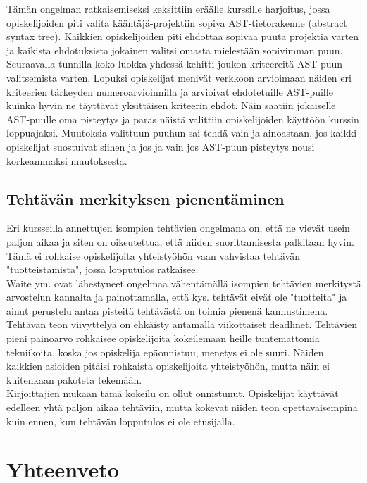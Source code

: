 \documentclass[finnish]{article}
\begin{document}
Tämän ongelman ratkaisemiseksi keksittiin eräälle kurssille harjoitus, jossa opiskelijoiden piti valita kääntäjä-projektiin sopiva AST-tietorakenne (abstract syntax tree). Kaikkien opiskelijoiden piti ehdottaa sopivaa puuta projektia varten ja kaikista ehdotuksista jokainen valitsi omasta mielestään sopivimman puun. Seuraavalla tunnilla koko luokka yhdessä kehitti joukon kriteereitä AST-puun valitsemista varten. Lopuksi opiskelijat menivät verkkoon arvioimaan näiden eri kriteerien tärkeyden numeroarvioinnilla ja arvioivat ehdotetuille AST-puille kuinka hyvin ne täyttävät yksittäisen kriteerin ehdot. Näin saatiin jokaiselle AST-puulle oma pisteytys ja paras näistä valittiin opiskelijoiden käyttöön kurssin loppuajaksi. Muutoksia valittuun puuhun sai tehdä vain ja ainoastaan, jos kaikki opiskelijat suostuivat siihen ja jos ja vain jos AST-puun pisteytys nousi korkeammaksi muutoksesta.

\subsection{Tehtävän merkityksen pienentäminen}

Eri kursseilla annettujen isompien tehtävien ongelmana on, että ne vievät usein paljon aikaa ja siten on oikeutettua, että niiden suorittamisesta palkitaan hyvin. Tämä ei rohkaise opiskelijoita yhteistyöhön vaan vahvistaa tehtävän "tuotteistamista", jossa lopputulos ratkaisee.\\

Waite ym. ovat lähestyneet ongelmaa vähentämällä isompien tehtävien merkitystä arvostelun kannalta ja painottamalla, että kys. tehtävät eivät ole "tuotteita" ja ainut perustelu antaa pisteitä tehtävästä on toimia pienenä kannustimena. Tehtävän teon viivyttelyä on ehkäisty antamalla viikottaiset deadlinet. Tehtävien pieni painoarvo rohkaisee opiskelijoita kokeilemaan heille tuntemattomia tekniikoita, koska jos opiskelija epäonnistuu, menetys ei ole suuri. Näiden kaikkien asioiden pitäisi rohkaista opiskelijoita yhteistyöhön, mutta näin ei kuitenkaan pakoteta tekemään.\\

Kirjoittajien mukaan tämä kokeilu on ollut onnistunut. Opiskelijat käyttävät edelleen yhtä paljon aikaa tehtäviin, mutta kokevat niiden teon opettavaisempina kuin ennen, kun tehtävän lopputulos ei ole etusijalla.

\section{Yhteenveto}
\end{document}
